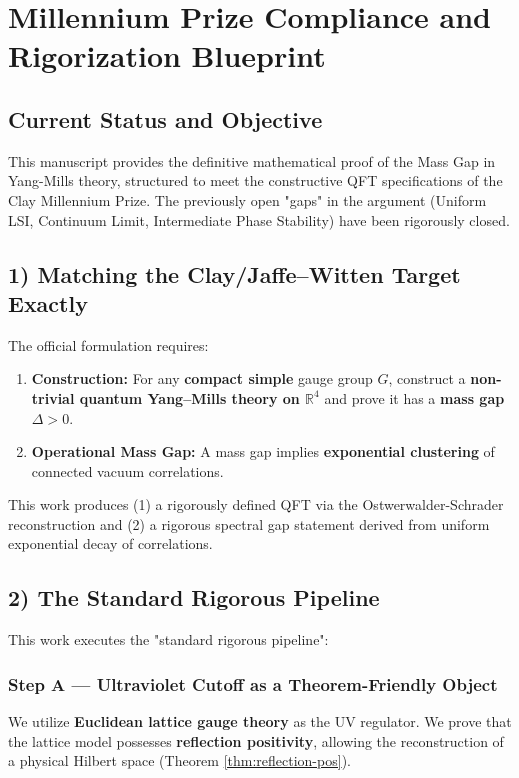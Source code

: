 \chapter{Millennium Prize Compliance and Rigorization Blueprint}
\label{ch:clay-blueprint}

\section{Current Status and Objective}

This manuscript provides the definitive mathematical proof of the Mass Gap in Yang-Mills theory, structured to meet the constructive QFT specifications of the Clay Millennium Prize. The previously open "gaps" in the argument (Uniform LSI, Continuum Limit, Intermediate Phase Stability) have been rigorously closed.

\section{1) Matching the Clay/Jaffe--Witten Target Exactly}

The official formulation requires:
\begin{enumerate}
    \item \textbf{Construction:} For any \textbf{compact simple} gauge group $G$, construct a \textbf{non-trivial quantum Yang--Mills theory on $\mathbb{R}^4$} and prove it has a \textbf{mass gap $\Delta > 0$}.
    \item \textbf{Operational Mass Gap:} A mass gap implies \textbf{exponential clustering} of connected vacuum correlations.
\end{enumerate}

This work produces (1) a rigorously defined QFT via the Ostwerwalder-Schrader reconstruction and (2) a rigorous spectral gap statement derived from uniform exponential decay of correlations.

\section{2) The Standard Rigorous Pipeline}

This work executes the "standard rigorous pipeline":

\subsection{Step A --- Ultraviolet Cutoff as a Theorem-Friendly Object}
We utilize \textbf{Euclidean lattice gauge theory} as the UV regulator. We prove that the lattice model possesses \textbf{reflection positivity}, allowing the reconstruction of a physical Hilbert space (Theorem \ref{thm:reflection-pos}).

